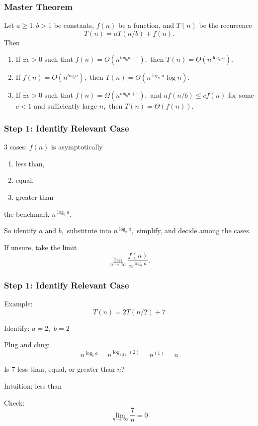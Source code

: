 \documentclass[10pt,aspectratio=169]{beamer}
\begin{document}
\begin{frame} \frametitle{Master Theorem}
Let $a \geq 1, b>1$ be constants, $f(n)$ be a function, and $T(n)$ be the recurrence
\[ T(n) = a T(n/b) +f(n) . \]
Then
\begin{enumerate}
  \item If $\exists \epsilon>0$ such that $f(n) = O(n^{log_b a-\epsilon}),$ then $T(n)=\Theta(n^{\log_b a}).$
  \item If $f(n) = O(n^{log_b a}),$ then $T(n)=\Theta(n^{\log_b a} \log n).$
  \item If $\exists \epsilon>0$ such that $f(n) = \Omega(n^{log_b a+\epsilon}),$
    and $a f(n/b) \leq cf(n)$ for some $c<1$ and sufficiently large $n,$
    then $T(n)=\Theta(f(n)).$
\end{enumerate}
\end{frame}

\begin{frame} \frametitle{Step 1: Identify Relevant Case}
  3 cases: $f(n)$ is asymptotically
  \begin{enumerate}
    \item less than,
    \item equal,
    \item greater than
  \end{enumerate}
  the benchmark $ n^{\log_b a} .$
  \vspace{10pt}

  So identify $a$ and $b,$ substitute into $n^{\log_b a},$ simplify, and decide among the cases.
  \vspace{10pt}

  If unsure, take the limit
  \[ \lim_{n \rightarrow \infty} \frac{f(n)}{n^{\log_b a}} . \]
\end{frame}

\begin{frame} \frametitle{Step 1: Identify Relevant Case}
  Example:
  \[ T(n) = 2 T(n/2) + 7 \]

  Identify: $a=2,$ $b=2$

  Plug and chug:
  \[ n^{\log_b a} = n^{\log_{(2)} (2)} = n^{(1)} = n \]

  Is $7$ less than, equal, or greater than $n$? \vspace{10pt}

  Intuition: less than \vspace{10pt}

  Check:
  \[ \lim_{n \rightarrow \infty} \frac{7}{n} = 0 \]
 \end{frame}
\end{document}
